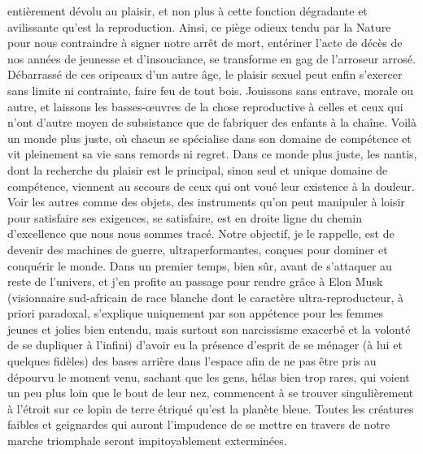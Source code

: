 entièrement dévolu au plaisir, et non plus à cette fonction dégradante et avilissante qu’est la reproduction. Ainsi, ce piège odieux tendu par la Nature pour nous contraindre à signer notre arrêt de mort, entériner l’acte de décès de nos années de jeunesse et d’insouciance, se transforme en gag de l’arroseur arrosé. Débarrassé de ces oripeaux d’un autre âge, le plaisir sexuel peut enfin s’exercer sans limite ni contrainte, faire feu de tout bois. Jouissons sans entrave, morale ou autre, et laissons les basses-œuvres de la chose reproductive à celles et ceux qui n’ont d’autre moyen de subsistance que de fabriquer des enfants à la chaîne. Voilà un monde plus juste, où chacun se spécialise dans son domaine de compétence et vit pleinement sa vie sans remords ni regret. Dans ce monde plus juste, les nantis, dont la recherche du plaisir est le principal, sinon seul et unique domaine de compétence, viennent au secours de ceux qui ont voué leur existence à la douleur. Voir les autres comme des objets, des instruments qu’on peut manipuler à loisir pour satisfaire ses exigences, se satisfaire, est en droite ligne du chemin d’excellence que nous nous sommes tracé. Notre objectif, je le rappelle, est de devenir des machines de guerre, ultraperformantes, conçues pour dominer et conquérir le monde. Dans un premier temps, bien sûr, avant de s’attaquer au reste de l’univers, et j’en profite au passage pour rendre grâce à Elon Musk (visionnaire sud-africain de race blanche dont le caractère ultra-reproducteur, à priori paradoxal, s’explique uniquement par son appétence pour les femmes jeunes et jolies bien entendu, mais surtout son narcissisme exacerbé et la volonté de se dupliquer à l’infini) d’avoir eu la présence d’esprit de se ménager (à lui et quelques fidèles) des bases arrière dans l’espace afin de ne pas être pris au dépourvu le moment venu, sachant que les gens, hélas bien trop rares, qui voient un peu plus loin que le bout de leur nez, commencent à se trouver singulièrement à l’étroit sur ce lopin de terre étriqué qu’est la planète bleue. Toutes les créatures faibles et geignardes qui auront l’impudence de se mettre en travers de notre marche triomphale seront impitoyablement exterminées.

